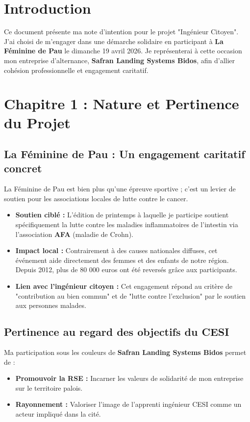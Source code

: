 \section*{Introduction}
Ce document présente ma note d'intention pour le projet "Ingénieur Citoyen". J'ai choisi de m'engager dans une démarche solidaire en participant à \textbf{La Féminine de Pau} le dimanche 19 avril 2026. Je représenterai à cette occasion mon entreprise d'alternance, \textbf{Safran Landing Systems Bidos}, afin d'allier cohésion professionnelle et engagement caritatif.

\newpage

\section*{Chapitre 1 : Nature et Pertinence du Projet}

\subsection*{La Féminine de Pau : Un engagement caritatif concret}
{}
La Féminine de Pau est bien plus qu'une épreuve sportive ; c'est un levier de soutien pour les associations locales de lutte contre le cancer. 
\begin{itemize}
    \item \textbf{Soutien ciblé :} L'édition de printemps à laquelle je participe soutient spécifiquement la lutte contre les maladies inflammatoires de l'intestin via l'association \textbf{AFA} (maladie de Crohn). 
    \item \textbf{Impact local :} Contrairement à des causes nationales diffuses, cet événement aide directement des femmes et des enfants de notre région. Depuis 2012, plus de 80 000 euros ont été reversés grâce aux participants.
    \item \textbf{Lien avec l'ingénieur citoyen :} Cet engagement répond au critère de "contribution au bien commun" et de "lutte contre l'exclusion" par le soutien aux personnes malades.
\end{itemize}

\subsection*{Pertinence au regard des objectifs du CESI}
{}
Ma participation sous les couleurs de \textbf{Safran Landing Systems Bidos} permet de :
\begin{itemize}
    \item \textbf{Promouvoir la RSE :} Incarner les valeurs de solidarité de mon entreprise sur le territoire palois.
    \item \textbf{Rayonnement :} Valoriser l'image de l'apprenti ingénieur CESI comme un acteur impliqué dans la cité.
\end{itemize}

